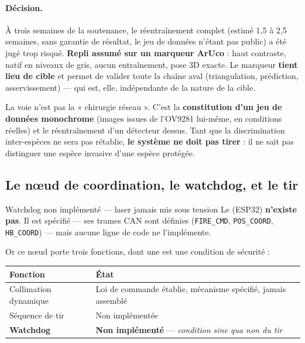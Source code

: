 \documentclass[11pt,a4paper]{article}
\begin{document}
\paragraph{Décision.} À trois semaines de la soutenance, le réentraînement complet
(estimé 1,5 à 2,5 semaines, sans garantie de résultat, le jeu de données n'étant pas public)
a été jugé trop risqué. \textbf{Repli assumé sur un marqueur ArUco}
\cite{garridojurado2014aruco} : haut contraste, natif en niveaux de gris, aucun
entraînement, pose 3D exacte. Le marqueur \textbf{tient lieu de cible} et permet de valider
toute la chaîne aval (triangulation, prédiction, asservissement) — qui est, elle,
indépendante de la nature de la cible.

\begin{note}
La voie n'est pas la « chirurgie réseau ». C'est la \textbf{constitution d'un jeu de données
monochrome} (images issues de l'OV9281 lui-même, en conditions réelles) et le
réentraînement d'un détecteur dessus. Tant que la discrimination inter-espèces ne sera pas
rétablie, \textbf{le système ne doit pas tirer} : il ne sait pas distinguer une espèce
invasive d'une espèce protégée.
\end{note}

\subsection{Le n\oe ud de coordination, le watchdog, et le tir}

\begin{verroureporte}{Watchdog non implémenté — laser jamais mis sous tension}
Le  (ESP32) \textbf{n'existe pas}. Il est spécifié — ses trames
CAN sont définies (\texttt{FIRE\_CMD}, \texttt{POS\_COORD}, \texttt{HB\_COORD}) — mais
aucune ligne de code ne l'implémente.
\end{verroureporte}

Or ce n\oe ud porte trois fonctions, dont une est une condition de sécurité :

\begin{center}
\begin{tabularx}{\textwidth}{@{}lX@{}}
\toprule
\textbf{Fonction} & \textbf{État} \\
\midrule
Collimation dynamique & Loi de commande établie, mécanisme spécifié, jamais assemblé \\
Séquence de tir & Non implémentée \\
\textbf{Watchdog} & \textbf{Non implémenté} — \emph{condition sine qua non du tir} \\
\bottomrule
\end{tabularx}
\end{center}
\end{document}
